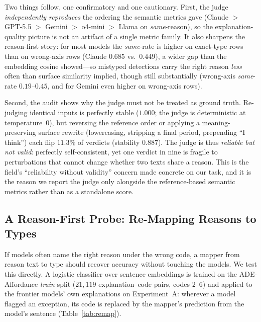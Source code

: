 \documentclass[runningheads]{llncs}
\begin{document}
Two things follow, one confirmatory and one cautionary.
First, the judge \emph{independently reproduces} the ordering the semantic metrics gave (Claude $>$ GPT-5.5 $>$ Gemini $>$ o4-mini $>$ Llama on \emph{same}-reason), so the explanation-quality picture is not an artifact of a single metric family.
It also sharpens the reason-first story: for most models the \emph{same}-rate is higher on exact-type rows than on wrong-axis rows (Claude $0.685$ vs.\ $0.449$), a wider gap than the embedding cosine showed---so mistyped detections carry the right reason \emph{less} often than surface similarity implied, though still substantially (wrong-axis \emph{same}-rate $0.19$--$0.45$, and for Gemini even higher on wrong-axis rows).

Second, the audit shows why the judge must not be treated as ground truth.
Re-judging identical inputs is perfectly stable ($1.000$; the judge is deterministic at temperature~$0$), but reversing the reference order or applying a meaning-preserving surface rewrite (lowercasing, stripping a final period, prepending ``I think'') each flip \textbf{$11.3\%$} of verdicts (stability $0.887$).
The judge is thus \emph{reliable but not valid}: perfectly self-consistent, yet one verdict in nine is fragile to perturbations that cannot change whether two texts share a reason.
This is the field's ``reliability without validity'' concern made concrete on our task, and it is the reason we report the judge only alongside the reference-based semantic metrics rather than as a standalone score.

\subsection{A Reason-First Probe: Re-Mapping Reasons to Types}
\label{sec:remap}

If models often name the right reason under the wrong code, a mapper from reason text to type should recover accuracy without touching the models.
We test this directly.
A logistic classifier over sentence embeddings is trained on the ADE-Affordance \emph{train} split ($21{,}119$ explanation--code pairs, codes 2--6) and applied to the frontier models' own explanations on Experiment~A: wherever a model flagged an exception, its code is replaced by the mapper's prediction from the model's sentence (Table~\ref{tab:remap}).
\end{document}
